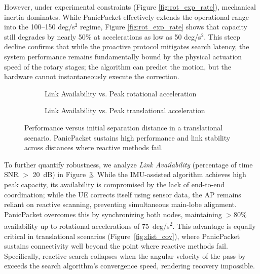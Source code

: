 \documentclass[fleqn,10pt]{wlscirep}
\begin{document}
However, under experimental constraints (Figure \ref{fig:rot_exp_rate}), mechanical inertia dominates. While PanicPacket effectively extends the operational range into the 100--150 deg/s$^2$ regime, Figure \ref{fig:rot_exp_rate} shows that capacity still degrades by nearly 50\% at accelerations as low as 50 deg/s$^2$. This steep decline confirms that while the proactive protocol mitigates search latency, the system performance remains fundamentally bound by the physical actuation speed of the rotary stages; the algorithm can predict the motion, but the hardware cannot instantaneously execute the correction.

\begin{figure}[h!]
    \centering
    \begin{subfigure}{0.48\linewidth}
        
        \vspace{-25 pt}
        \caption{Link Availability vs. Peak rotational acceleration}
        \label{fig:rotionalLinkAvail}
    \end{subfigure}
    \hfill
    \begin{subfigure}{0.48\linewidth}
        
        \vspace{-25 pt}
        \caption{Link Availability vs. Peak translational acceleration}
        \label{fig:translationalLinkAvail}
    \end{subfigure}
    \caption{Performance versus initial separation distance in a translational scenario. PanicPacket sustains high performance and link stability across distances where reactive methods fail.}
    \label{fig:accelLinkAvail}
\end{figure}

To further quantify robustness, we analyze \textit{Link Availability} (percentage of time SNR $>$ \SI{20}{dB}) in Figure~\ref{fig:accelLinkAvail}. While the IMU-assisted algorithm achieves high peak capacity, its availability is compromised by the lack of end-to-end coordination; while the UE corrects itself using sensor data, the AP remains reliant on reactive scanning, preventing simultaneous main-lobe alignment. PanicPacket overcomes this by synchronizing both nodes, maintaining $>80\%$ availability up to rotational accelerations of \SI{75}{deg/s^2}. This advantage is equally critical in translational scenarios (Figure~\ref{fig:dist_cov}), where PanicPacket sustains connectivity well beyond the point where reactive methods fail. Specifically, reactive search collapses when the angular velocity of the pass-by exceeds the search algorithm's convergence speed, rendering recovery impossible.
\end{document}
